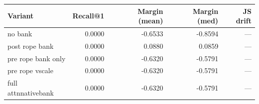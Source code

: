 \begin{tabular}{l r r r r}
\toprule
Variant & Recall@1 & Margin (mean) & Margin (med) & JS drift \\
\midrule
no bank & 0.0000 & -0.6533 & -0.8594 & — \\
post rope bank & 0.0000 & 0.0880 & 0.0859 & — \\
pre rope bank only & 0.0000 & -0.6320 & -0.5791 & — \\
pre rope vscale & 0.0000 & -0.6320 & -0.5791 & — \\
full attnnativebank & 0.0000 & -0.6320 & -0.5791 & — \\
\bottomrule
\end{tabular}
